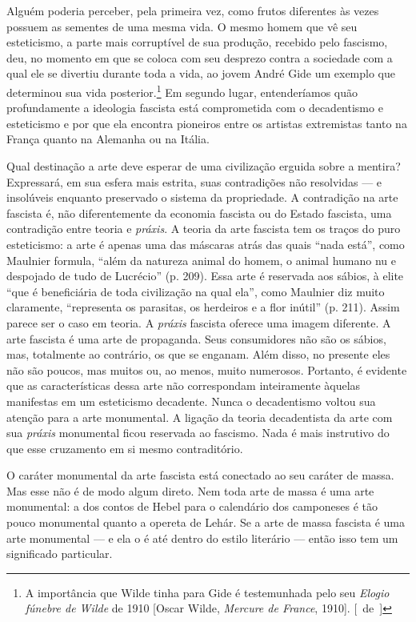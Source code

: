 Alguém poderia perceber, pela primeira vez, como frutos diferentes às
vezes possuem as sementes de uma mesma vida. O mesmo homem que vê seu
esteticismo, a parte mais corruptível de sua produção, recebido pelo
fascismo, deu, no momento em que se coloca com seu desprezo contra a
sociedade com a qual ele se divertiu durante toda a vida, ao jovem
André Gide um exemplo que determinou sua vida posterior.\footnote{A
  importância que Wilde tinha para Gide é testemunhada pelo seu
  \emph{Elogio fúnebre de Wilde} de 1910 {[}Oscar Wilde, \emph{Mercure
  de France}, 1910{]}. [~de~]} Em segundo lugar, entenderíamos quão
profundamente a ideologia fascista está comprometida com o decadentismo
e esteticismo e por que ela encontra pioneiros entre os artistas
extremistas tanto na França quanto na Alemanha ou na Itália.

Qual destinação a arte deve esperar de uma civilização erguida sobre a
mentira? Expressará, em sua esfera mais estrita, suas contradições não
resolvidas --- e insolúveis enquanto preservado o sistema da propriedade.
A contradição na arte fascista é, não diferentemente da economia
fascista ou do Estado fascista, uma contradição entre teoria e
\emph{práxis}. A teoria da arte fascista tem os traços do puro
esteticismo: a arte é apenas uma das máscaras atrás das quais ``nada
está'', como Maulnier formula, ``além da natureza animal do homem, o
animal humano nu e despojado de tudo de Lucrécio'' (p. 209). Essa arte é
reservada aos sábios, à elite ``que é beneficiária de toda civilização
na qual ela'', como Maulnier diz muito claramente, ``representa os
parasitas, os herdeiros e a flor inútil'' (p. 211). Assim parece ser o
caso em teoria. A \emph{práxis} fascista oferece uma imagem diferente.
A arte fascista é uma arte de propaganda. Seus consumidores não são os
sábios, mas, totalmente ao contrário, os que se enganam. Além disso, no
presente eles não são poucos, mas muitos ou, ao menos, muito numerosos.
Portanto, é evidente que as características dessa arte não correspondam
inteiramente àquelas manifestas em um esteticismo decadente. Nunca o
decadentismo voltou sua atenção para a arte monumental. A ligação da
teoria decadentista da arte com sua \emph{práxis} monumental ficou
reservada ao fascismo. Nada é mais instrutivo do que esse cruzamento
em si mesmo contraditório.

O caráter monumental da arte fascista está conectado ao seu caráter de
massa. Mas esse não é de modo algum direto. Nem toda arte de massa é uma
arte monumental: a dos contos de Hebel para o calendário dos camponeses
é tão pouco monumental quanto a opereta de Lehár. Se a arte de massa fascista
é uma arte monumental --- e ela o é até dentro do estilo literário ---
então isso tem um significado particular.

